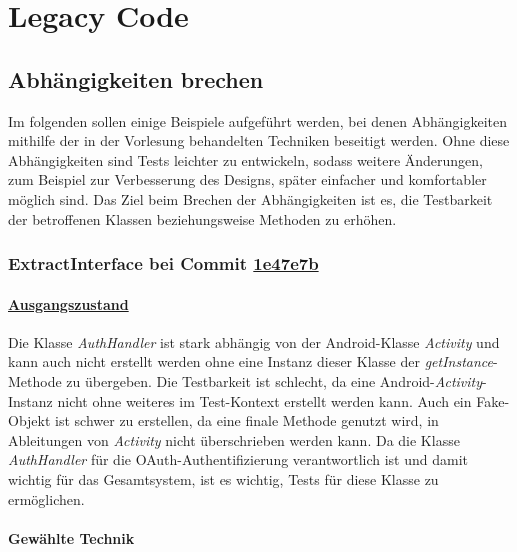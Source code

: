 \chapter{Legacy Code}

\section{Abhängigkeiten brechen}

Im folgenden sollen einige Beispiele aufgeführt werden, bei denen Abhängigkeiten mithilfe der in der Vorlesung behandelten Techniken beseitigt werden.
Ohne diese Abhängigkeiten sind Tests leichter zu entwickeln, sodass weitere Änderungen, zum Beispiel zur Verbesserung des Designs, später einfacher und komfortabler möglich sind.
Das Ziel beim Brechen der Abhängigkeiten ist es, die Testbarkeit der betroffenen Klassen beziehungsweise Methoden zu erhöhen.

\newpage

\subsection{ExtractInterface bei Commit \href{https://github.com/lukaspanni/OpenSourceStats/commit/1e47e7b2d42c04429a433a6ac3dbea781409d36d} {1e47e7b}}
\label{sec:ExtractInterface_AuthHandler_1}

\subsubsection*{\href{https://github.com/lukaspanni/OpenSourceStats/tree/0daf8862a81a976e3d6341f5b5461bc8d3c64b4f/app/src/main/java/de/lukaspanni/opensourcestats/auth/}{Ausgangszustand}}

Die Klasse \textit{AuthHandler} ist stark abhängig von der Android-Klasse \textit{Activity} und kann auch nicht erstellt werden ohne eine Instanz dieser Klasse der \textit{getInstance}-Methode zu übergeben.
Die Testbarkeit ist schlecht, da eine Android-\textit{Activity}-Instanz nicht ohne weiteres im Test-Kontext erstellt werden kann.
Auch ein Fake-Objekt ist schwer zu erstellen, da eine finale Methode genutzt wird, in Ableitungen von \textit{Activity} nicht überschrieben werden kann.
Da die Klasse \textit{AuthHandler} für die OAuth-Authentifizierung verantwortlich ist und damit wichtig für das Gesamtsystem, ist es wichtig, Tests für diese Klasse zu ermöglichen.

\subsubsection*{Gewählte Technik}

